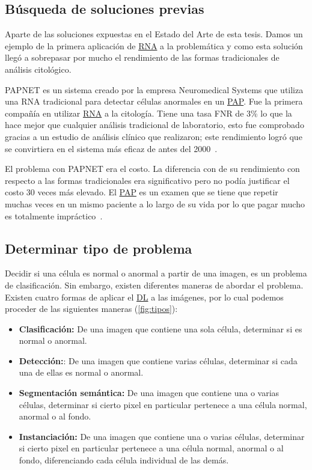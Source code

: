 \subsection{Búsqueda de soluciones previas}

Aparte de las soluciones expuestas en el Estado del Arte de esta tesis. Damos un
ejemplo de la primera aplicación de \hyperlink{abbr}{RNA} a la problemática y
como esta solución llegó a sobrepasar por mucho el rendimiento de las formas
tradicionales de análisis citológico. 

PAPNET es un sistema creado por la empresa Neuromedical Systems que utiliza una
RNA tradicional para detectar células anormales en un \hyperlink{abbr}{PAP}. Fue
la primera compañía en utilizar \hyperlink{abbr}{RNA} a la citología. Tiene una
tasa FNR de 3\% lo que la hace mejor que cualquier análisis tradicional de
laboratorio, esto fue comprobado gracias a un estudio de análisis clínico que
realizaron; este rendimiento logró que se convirtiera en el sistema más eficaz
de antes del 2000~\cite{DeCresce1991}.

El problema con PAPNET era el costo. La diferencia con de su rendimiento con
respecto a las formas tradicionales era significativo pero no podía justificar
el costo 30 veces más elevado. El \hyperlink{abbr}{PAP} es un examen que se
tiene que repetir muchas veces en un mismo paciente a lo largo de su vida por lo
que pagar mucho es totalmente impráctico~\cite{Media}. 

\subsection{Determinar tipo de problema}

Decidir si una célula es normal o anormal a partir de una imagen, es un problema
de clasificación. Sin embargo, existen diferentes maneras de abordar el
problema. Existen cuatro formas de aplicar el \hyperlink{abbr}{DL} a las
imágenes, por lo cual podemos proceder de las siguientes maneras (\autoref{fig:tipos}):

\begin{itemize}
    \item{\textbf{Clasificación:}} De una imagen que contiene una sola célula,
    determinar si es normal o anormal.
    \item{\textbf{Detección:}}: De una imagen que contiene varias células,
    determinar si cada una de ellas es normal o anormal.
    \item{\textbf{Segmentación semántica:}} De una imagen que contiene una o
    varias células, determinar si cierto pixel en particular pertenece a una
    célula normal, anormal o al fondo.
    \item{\textbf{Instanciación:}} De una imagen que contiene una o varias
    células, determinar si cierto pixel en particular pertenece a una célula
    normal, anormal o al fondo, diferenciando cada célula individual de las
    demás. 
\end{itemize}

